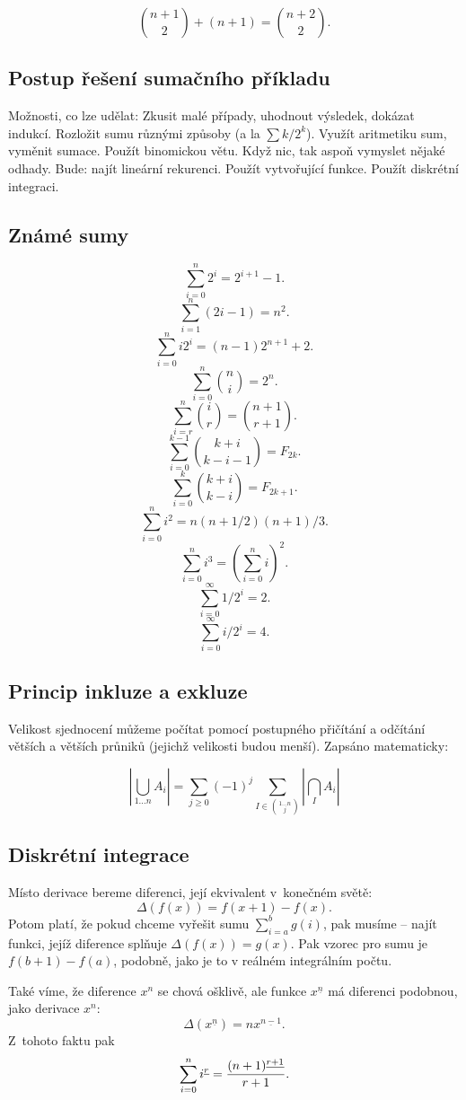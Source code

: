 $${n+1 \choose 2} + (n+1) = {n+2 \choose 2}.$$ 


\subsection{Postup řešení sumačního příkladu}

Možnosti, co lze udělat:
\itemize\ibull
\: Zkusit malé případy, uhodnout výsledek, dokázat indukcí.
\: Rozložit sumu různými způsoby (a la $\sum k/2^k$).
\: Využít aritmetiku sum, vyměnit sumace.
\: Použít binomickou větu.
\: Když nic, tak aspoň vymyslet nějaké odhady.
\: Bude: najít lineární rekurenci.
\: Použít vytvořující funkce.
\: Použít diskrétní integraci.
\endlist

\subsection{Známé sumy}
$$\sum_{i=0}^n 2^i = 2^{i+1}-1. $$
$$\sum_{i=1}^n (2i-1) = n^2.$$
$$\sum_{i=0}^n i2^i = (n-1)2^{n+1} + 2.$$
$$\sum_{i=0}^n {n \choose i} = 2^n.$$
$$\sum_{i=r}^n {i \choose r} = {n+1 \choose r+1}.$$
$$\sum_{i=0}^{k-1} {k+i \choose k-i-1} = F_{2k}. $$
$$\sum_{i=0}^{k} {k+i \choose k-i} = F_{2k+1}. $$
$$\sum_{i=0}^n i^2 = n(n+1/2)(n+1)/3. $$
$$\sum_{i=0}^n i^3 = (\sum_{i=0}^n i)^2.$$
$$\sum_{i=0}^\infty 1/2^i = 2. $$
$$\sum_{i=0}^\infty i/2^i = 4. $$

\subsection{Princip inkluze a exkluze}
Velikost sjednocení mů\-že\-me po\-čí\-tat pomocí postupného při\-čí\-tá\-ní a odčítání větších
a větších průniků (jejichž velikosti budou menší). Zapsáno matematicky:

$$|\bigcup_{1\dots n} A_i| = \sum_{j\ge 0} (-1)^j \sum_{I \in {1\dots n \choose j}} |\bigcap_I A_i|$$


\subsection{Diskrétní integrace}
Místo derivace bereme diferenci, její ekvivalent v~konečném světě:
$$ \Delta(f(x)) = f(x+1) - f(x).$$
Potom platí, že pokud chceme vyřešit sumu 
$ \sum_{i=a}^{b} g(i) $, pak musíme  -- najít funkci, jejíž
diference splňuje $\Delta(f(x)) = g(x)$. Pak vzorec pro sumu je $f(b+1) - f(a)$, podobně,
jako je to v reálném integrálním počtu.

Také víme, že diference $x^n$ se chová ošklivě, ale funkce $x^{\underline{n}}$ má diferenci
podobnou, jako derivace $x^n$:
$$\Delta(x^{\underline{n}}) = n x^{\underline{n-1}}.$$
Z~tohoto faktu pak
$$\sum_{i=0}^n i^{\underline{r}} = {(n+1)^{\underline{r+1}} \over r+1}.$$

\bye